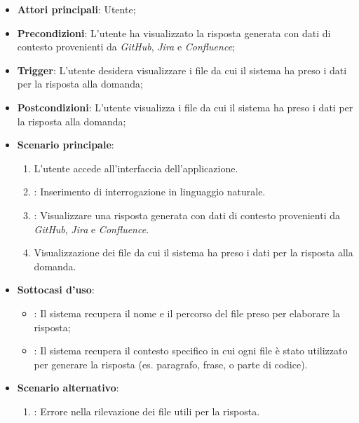 \begin{itemize}
    \item \textbf{Attori principali}: Utente;
    \item \textbf{Precondizioni}: L'utente ha visualizzato la risposta generata con dati di contesto provenienti da \emph{GitHub}, \emph{Jira} e \emph{Confluence};
    \item \textbf{Trigger}: L'utente desidera visualizzare i file da cui il sistema ha preso i dati per la risposta alla domanda;
    \item \textbf{Postcondizioni}: L'utente visualizza i file da cui il sistema ha preso i dati per la risposta alla domanda;
    \item \textbf{Scenario principale}:
    \begin{enumerate}
        \item L'utente accede all'interfaccia dell'applicazione.
        \item {}: Inserimento di interrogazione in linguaggio naturale.
        \item {}: Visualizzare una risposta generata con dati di contesto provenienti da \emph{GitHub}, \emph{Jira} e \emph{Confluence}.
        \item Visualizzazione dei file da cui il sistema ha preso i dati per la risposta alla domanda.
    \end{enumerate}
    \item \textbf{Sottocasi d'uso}:
    \begin{itemize}
        \item {}: Il sistema recupera il nome e il percorso del file preso per elaborare la risposta;
        \item {}: Il sistema recupera il contesto specifico in cui ogni file è stato utilizzato
        per generare la risposta (es. paragrafo, frase, o parte di codice).
    \end{itemize}
    \item \textbf{Scenario alternativo}:
    \begin{enumerate}
        \item {}: Errore nella rilevazione dei file utili per la risposta.
    \end{enumerate}
\end{itemize}

\hypertarget{UC15}{}

